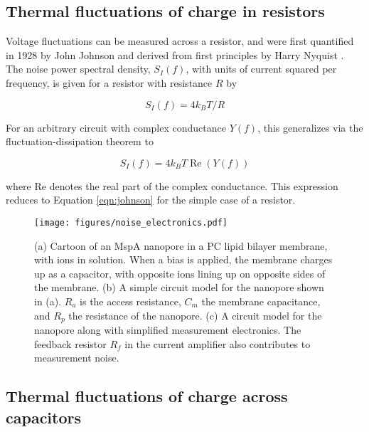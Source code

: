 \subsection{Thermal fluctuations of charge in resistors}

Voltage fluctuations can be measured across a resistor, and were first quantified in 1928 by John Johnson \citep{Johnson1928} and derived from first principles by Harry Nyquist \citep{Nyquist1928}.  The noise power spectral density, $S_I (f)$, with units of current squared per frequency, is given for a resistor with resistance $R$ by

\begin{equation}
S_I(f) = 4 k_B T / R
\label{eqn:johnson}
\end{equation}

For an arbitrary circuit with complex conductance $Y(f)$, this generalizes via the fluctuation-dissipation theorem to \citep{Kogan1996, Hoogerheide2010, Sakmann1995}

\begin{equation}
S_I(f) = 4 k_B T \operatorname{Re}(Y(f))
\label{eqn:general}
\end{equation}

\noindent
where Re denotes the real part of the complex conductance.  This expression reduces to Equation \ref{eqn:johnson} for the simple case of a resistor.

\begin{figure}[h]
\begin{centering}
\texttt{[image: figures/noise\_electronics.pdf]}
\caption[Simple electrical model of the nanopore setup]{(a) Cartoon of an MspA nanopore in a PC lipid bilayer membrane, with ions in solution.  When a bias is applied, the membrane charges up as a capacitor, with opposite ions lining up on opposite sides of the membrane.  (b) A simple circuit model for the nanopore shown in (a).  $R_a$ is the access resistance, $C_m$ the membrane capacitance, and $R_p$ the resistance of the nanopore.  (c) A circuit model for the nanopore along with simplified measurement electronics.  The feedback resistor $R_f$ in the current amplifier also contributes to measurement noise.}
\label{fig:circuit_equiv}
\end{centering}
\end{figure}

\subsection{Thermal fluctuations of charge across capacitors}

